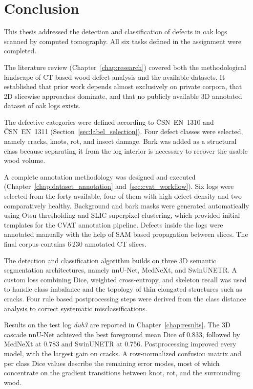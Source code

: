\chapter*{Conclusion}

This thesis addressed the detection and classification of defects in oak logs scanned by computed tomography. All six tasks defined in the assignment were completed.

The literature review (Chapter~\ref{chap:research}) covered both the methodological landscape of CT based wood defect analysis and the available datasets. It established that prior work depends almost exclusively on private corpora, that 2D slicewise approaches dominate, and that no publicly available 3D annotated dataset of oak logs exists.

The defective categories were defined according to ČSN~EN~1310 and ČSN~EN~1311 (Section~\ref{sec:label_selection}). Four defect classes were selected, namely cracks, knots, rot, and insect damage. Bark was added as a structural class because separating it from the log interior is necessary to recover the usable wood volume.

A complete annotation methodology was designed and executed (Chapter~\ref{chap:dataset_annotation} and~\ref{sec:cvat_workflow}). Six logs were selected from the forty available, four of them with high defect density and two comparatively healthy. Background and bark masks were generated automatically using Otsu thresholding and SLIC superpixel clustering, which provided initial templates for the CVAT annotation pipeline. Defects inside the logs were annotated manually with the help of SAM based propagation between slices. The final corpus contains 6\,230 annotated CT slices.

The detection and classification algorithm builds on three 3D semantic segmentation architectures, namely nnU-Net, MedNeXt, and SwinUNETR. A custom loss combining Dice, weighted cross-entropy, and skeleton recall was used to handle class imbalance and the topology of thin elongated structures such as cracks. Four rule based postprocessing steps were derived from the class distance analysis to correct systematic misclassifications.

Results on the test log \textit{dub3} are reported in Chapter~\ref{chap:results}. The 3D cascade nnU-Net achieved the best foreground mean Dice of 0.833, followed by MedNeXt at 0.783 and SwinUNETR at 0.756. Postprocessing improved every model, with the largest gain on cracks. A row-normalized confusion matrix and per class Dice values describe the remaining error modes, most of which concentrate on the gradient transitions between knot, rot, and the surrounding wood.

